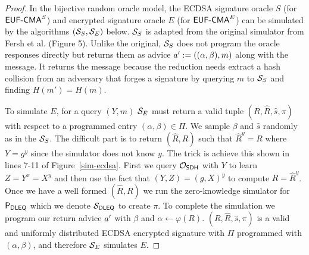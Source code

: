 \begin{proof}


  In the bijective random oracle model, the ECDSA signature oracle $S$ (for $\textsf{EUF-CMA}^S$) and encrypted signature oracle $E$ (for $\textsf{EUF-CMA}^E$) can be simulated by the algorithms $(\mathcal{S}_S, \mathcal{S}_E)$ below.
  $\mathcal{S}_S$ is adapted from the original simulator from Fersh et al.\cite{ecdsa-eufcma} (Figure 5).
  Unlike the original, $\mathcal{S}_S$ does not program the oracle responses directly but returns them as advice $a' := ((\alpha, \beta),m)$ along with the message.
  It returns the message because the reduction needs extract a hash collision from an adversary that forges a signature by querying $m$ to $\mathcal{S}_S$ and finding $H(m') = H(m)$.


  To simulate $E$, for a query $(Y,m)$ $\mathcal{S}_E$ must return a valid tuple $(R,\hat{R}, \hat{s}, \pi)$ with respect to a programmed entry $(\alpha, \beta) \in \Pi$.
  We sample $\beta$ and $\hat{s}$ randomly as in the $\mathcal{S}_S$.
  The difficult part is to return $(\hat{R}, R)$ such that $\hat{R}^y = R$ where $Y = g^y$ since the simulator does not know $y$.
  The trick is achieve this shown in lines 7-11 of Figure~\ref{sim-ecdsa}.
  First we query $\mathcal{O}_{\textsf{SDH}}$ with $Y$ to learn $Z = Y^x = X^y$ and then use the fact that $(Y,Z) = (g,X)^y$ to compute $R = \hat{R}^y$.
  Once we have a well formed $(\hat{R}, R)$ we run the zero-knowledge simulator for $\mathsf{P}_{\textsf{DLEQ}}$ which we denote $\mathcal{S}_{\textsf{DLEQ}}$ to create $\pi$.
  To complete the simulation we program our return advice $a'$ with $\beta$ and $\alpha \gets \varphi(R)$.
  $(R,\hat{R}, \hat{s}, \pi)$ is a valid and uniformly distributed ECDSA encrypted signature with $\Pi$ programmed with $(\alpha, \beta)$, and therefore $\mathcal{S}_E$ simulates $E$.


\end{proof}
